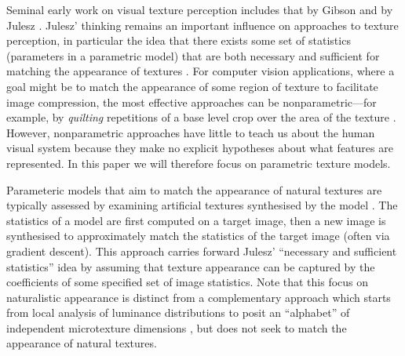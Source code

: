 \documentclass[doc, 11pt,a4paper,natbib]{apa6}\usepackage[]{graphicx}\usepackage[]{color}
\begin{document}
Seminal early work on visual texture perception includes that by Gibson \citep{gibson_perception_1950, beck_relation_1955} and by Julesz \citep{julesz_visual_1962,julesz_visual_1978,julesz_textons_1981}. 
Julesz' thinking remains an important influence on approaches to texture perception, in particular the idea that there exists some set of statistics (parameters in a parametric model) that are both necessary and sufficient for matching the appearance of textures \citep[see also][]{portilla_parametric_2000}. 
For  computer vision applications, where a goal might be to match the appearance of some region of texture to facilitate image compression, the most effective approaches can be nonparametric---for example, by \textit{quilting} repetitions of a base level crop over the area of the texture \citep[e.g.][]{efros_image_2001}. 
However, nonparametric approaches have little to teach us about the human visual system because they make no explicit hypotheses about what features are represented.
In this paper we will therefore focus on parametric texture models.

Parameteric models that aim to match the appearance of natural textures are typically assessed by examining artificial textures synthesised by the model \citep{heeger_pyramidbased_1995, safranek_perceptually_1990, safranek_perceptually_1989, zhu_filters_1998, portilla_parametric_2000}. 
The statistics of a model are first computed on a target image, then a new image is synthesised to approximately match the statistics of the target image (often via gradient descent).
This approach carries forward Julesz' ``necessary and sufficient statistics'' idea by assuming that texture appearance can be captured by the coefficients of some specified set of image statistics.
Note that this focus on naturalistic appearance is distinct from a complementary approach which starts from local analysis of luminance distributions to posit an ``alphabet'' of independent microtexture dimensions \citep{victor_perception_2013}, but does not seek to match the appearance of natural textures.
\end{document}
